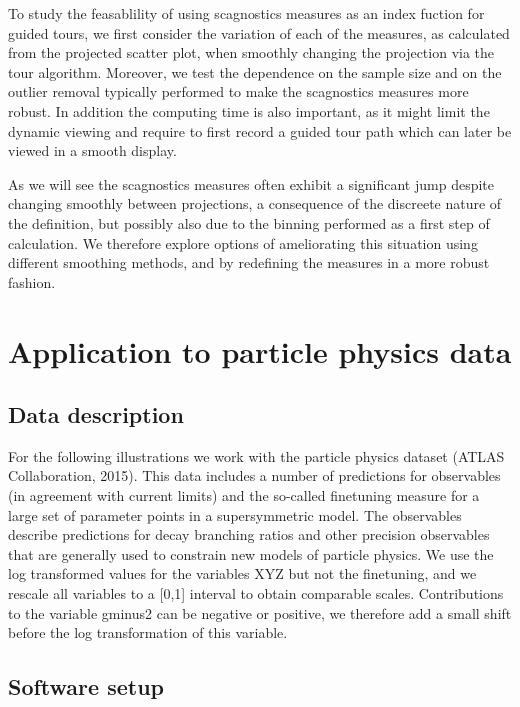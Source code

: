 \documentclass[article]{jss}
\begin{document}
To study the feasablility of using scagnostics measures as an index
fuction for guided tours, we first consider the variation of each of the
measures, as calculated from the projected scatter plot, when smoothly
changing the projection via the tour algorithm. Moreover, we test the
dependence on the sample size and on the outlier removal typically
performed to make the scagnostics measures more robust. In addition the
computing time is also important, as it might limit the dynamic viewing
and require to first record a guided tour path which can later be viewed
in a smooth display.

As we will see the scagnostics measures often exhibit a significant jump
despite changing smoothly between projections, a consequence of the
discreete nature of the definition, but possibly also due to the binning
performed as a first step of calculation. We therefore explore options
of ameliorating this situation using different smoothing methods, and by
redefining the measures in a more robust fashion.

\section{Application to particle physics
data}\label{application-to-particle-physics-data}

\subsection{Data description}\label{data-description}

For the following illustrations we work with the particle physics
dataset (ATLAS Collaboration, 2015). This data includes a number of
predictions for observables (in agreement with current limits) and the
so-called finetuning measure for a large set of parameter points in a
supersymmetric model. The observables describe predictions for decay
branching ratios and other precision observables that are generally used
to constrain new models of particle physics. We use the log transformed
values for the variables XYZ but not the finetuning, and we rescale all
variables to a {[}0,1{]} interval to obtain comparable scales.
Contributions to the variable gminus2 can be negative or positive, we
therefore add a small shift before the log transformation of this
variable.

\subsection{Software setup}\label{software-setup}
\end{document}
